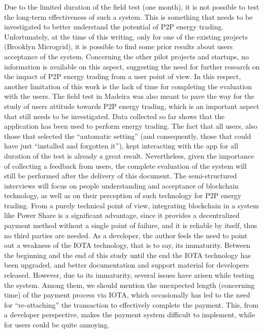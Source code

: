 Due to the limited duration of the field test (one month), it is not possible to test the long-term effectiveness of such a system. This is something that needs to be investigated to better understand the potential of P2P energy trading. Unfortunately, at the time of this writing, only for one of the existing projects (Brooklyn Microgrid), it is possible to find some prior results about users acceptance of the system. Concerning the other pilot projects and startups, no information is available on this aspect, suggesting the need for further research on the impact of P2P energy trading from a user point of view. In this respect, another limitation of this work is the lack of time for completing the evaluation with the users. The field test in Madeira was also meant to pave the way for the study of users attitude towards P2P energy trading, which is an important aspect that still needs to be investigated. Data collected so far shows that the application has been used to perform energy trading. The fact that all users, also those that selected the “automatic setting” (and consequently, those that could have just “installed and forgotten it”), kept interacting with the app for all duration of the test is already a great result. Nevertheless, given the importance of collecting a feedback from users, the complete evaluation of the system will still be performed after the delivery of this document.
The semi-structured interviews will focus on people understanding and acceptance of blockchain technology, as well as on their perception of such technology for P2P energy trading. From a purely technical point of view, integrating blockchain in a system like Power Share is a significant advantage, since it provides a decentralized payment method without a single point of failure, and it is reliable by itself, thus no third parties are needed. As a developer, the author feels the need to point out a weakness of the IOTA technology, that is to say, its immaturity.  Between the beginning and the end of this study until the end the IOTA technology has been upgraded, and better documentation and support material for developers released. However, due to its immaturity, several issues have arisen while testing the system. Among them, we should mention the unexpected length (concerning time) of the payment process via IOTA, which occasionally has led to the need for “re-attaching” the transaction to effectively complete the payment. This, from a developer perspective, makes the payment system difficult to implement, while for users could be quite annoying. 


